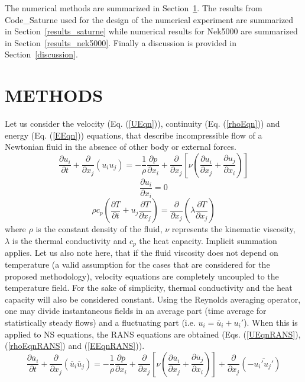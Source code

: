 \documentclass[11pt,letterpaper,english]{article}
\renewcommand{\eqref}[1]{(\ref{#1})}
\begin{document}
The numerical methods are summarized in Section~\ref{methods}. The results from Code\_Saturne used for the design of the numerical experiment are summarized in Section~\ref{results_saturne} while numerical results for Nek5000 are summarized in Section~\ref{results_nek5000}. Finally a discussion is provided in Section~\ref{discussion}.

\section{METHODS}
\label{methods}

Let us consider the velocity (Eq. \eqref{UEqn}), continuity (Eq. \eqref{rhoEqn}) and energy (Eq. \eqref{EEqn}) equations, that describe incompressible flow of a Newtonian fluid in the absence of other body or external forces.
\begin{equation}
\frac{\partial  u_i  }{\partial t} +  \frac{\partial}{\partial x_j} \left( u_i u_j \right) =-\frac{1}{\rho} \frac{\partial p}{\partial x_i} + \frac{\partial}{\partial x_j} \left[ \nu \left( \frac{\partial u_i}{\partial x_j} +\frac{\partial u_j}{\partial x_i} \right) \right]
\label{UEqn}
\end{equation}
\begin{equation}
\frac{\partial u_i}{\partial x_i} = 0
\label{rhoEqn}
\end{equation}
\begin{equation}
\rho c_p \left( \frac{\partial T }{\partial t} + u_j \frac{\partial T}{\partial x_j} \right) = \frac{\partial }{\partial x_j} \left( \lambda \frac{\partial T}{\partial x_j} \right)
\label{EEqn}
\end{equation}
where $\rho$ is the constant density of the fluid, $\nu$ represents the kinematic viscosity, $\lambda$ is the thermal conductivity and $c_p$ the heat capacity. Implicit summation applies. Let us also note here, that if the fluid viscosity does not depend on temperature (a valid assumption for the cases that are considered for the proposed methodology), velocity equations are completely uncoupled to the temperature field. For the sake of simplicity, thermal conductivity and the heat capacity will also be considered constant. Using the Reynolds averaging operator, one may divide instantaneous fields in an average part (time average for statistically steady flows) and a fluctuating part (i.e. $u_i = \overline{u}_i+u_i'$). When this is applied to NS equations, the RANS equations are obtained (Eqs. \eqref{UEqnRANS}, \eqref{rhoEqnRANS} and \eqref{EEqnRANS}).
\begin{equation}
\frac{\partial  \overline{u}_i  }{\partial t} +  \frac{\partial}{\partial x_j} \left( \overline{u}_i \overline{u}_j \right) =-\frac{1}{\rho} \frac{\partial \overline{p}}{\partial x_i} + \frac{\partial}{\partial x_j} \left[ \nu \left( \frac{\partial \overline{u}_i}{\partial x_j} +\frac{\partial \overline{u}_j}{\partial x_i} \right) \right] + \frac{\partial}{\partial x_j }\left( -\overline{u_i' u_j'} \right)
\label{UEqnRANS}
\end{equation}
\end{document}
